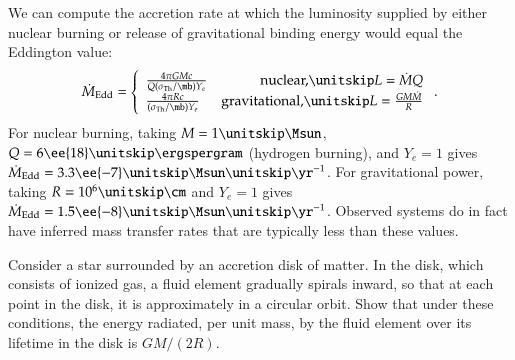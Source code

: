 We can compute the accretion rate at which the luminosity supplied by either nuclear burning or release of gravitational binding energy would equal the Eddington value:
\[
\dot{M}_{\mathrm{Edd}} = \left\{\begin{array}{lr}
	\frac{4\pi GM c}{Q(\sigma_{\mathrm{Th}}/\mb)Y_{e}}  & \textrm{nuclear,}\nsp L = \dot{M}Q \\
	\frac{4\pi R c}{(\sigma_{\mathrm{Th}}/\mb)Y_{e}} & \textrm{gravitational,}\nsp L= \frac{GM\dot{M}}{R}
\end{array}\right. .
\]
For nuclear burning, taking $M = 1\nsp\Msun$, $Q = 6\ee{18}\nsp\ergspergram$ (hydrogen burning), and $Y_{e} = 1$ gives $\dot{M}_{\mathrm{Edd}} = 3.3\ee{-7}\nsp\Msun\usp\yr^{-1}$.  For gravitational power, taking $R = 10^{6}\nsp\cm$ and $Y_{e} = 1$ gives $\dot{M}_{\mathrm{Edd}} = 1.5\ee{-8}\nsp\Msun\usp\yr^{-1}$.  Observed systems do in fact have inferred mass transfer rates that are typically less than these values.

\begin{exercisebox}\label{p.disk-L} Consider a star surrounded by an accretion disk of matter.  In the disk, which consists of ionized gas, a fluid element gradually spirals inward, so that at each point in the disk, it is approximately in a circular orbit.  Show that under these conditions, the energy radiated, per unit mass, by the fluid element over its lifetime in the disk is $GM/(2R)$.
\end{exercisebox}

